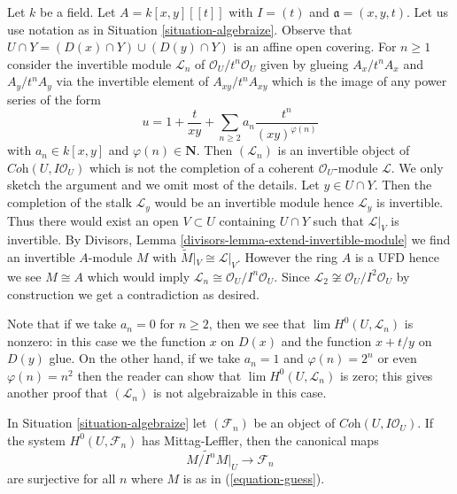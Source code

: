 \begin{example}
\label{example-not-algebraizable}
Let $k$ be a field. Let $A = k[x, y][[t]]$ with $I = (t)$ and
$\mathfrak a = (x, y, t)$. Let us use notation as in
Situation \ref{situation-algebraize}. Observe that
$U \cap Y = (D(x) \cap Y) \cup (D(y) \cap Y)$ is an affine
open covering. For $n \geq 1$ consider the invertible
module $\mathcal{L}_n$ of $\mathcal{O}_U/t^n\mathcal{O}_U$
given by glueing $A_x/t^nA_x$ and $A_y/t^nA_y$ via the invertible
element of $A_{xy}/t^nA_{xy}$ which is the image of any power series
of the form
$$
u = 1 + \frac{t}{xy} + \sum_{n \geq 2} a_n \frac{t^n}{(xy)^{\varphi(n)}}
$$
with $a_n \in k[x, y]$ and $\varphi(n) \in \mathbf{N}$.
Then $(\mathcal{L}_n)$ is an invertible object of
$\textit{Coh}(U, I\mathcal{O}_U)$ which is not the
completion of a coherent $\mathcal{O}_U$-module $\mathcal{L}$.
We only sketch the argument and we omit most of the details.
Let $y \in U \cap Y$. Then the completion of the stalk
$\mathcal{L}_y$ would be an invertible module hence $\mathcal{L}_y$
is invertible. Thus there would exist an open $V \subset U$
containing $U \cap Y$ such that $\mathcal{L}|_V$ is invertible.
By Divisors, Lemma \ref{divisors-lemma-extend-invertible-module}
we find an invertible $A$-module $M$ with
$\widetilde{M}|_V \cong \mathcal{L}|_V$. However the ring $A$
is a UFD hence we see $M \cong A$ which would imply
$\mathcal{L}_n \cong \mathcal{O}_U/I^n\mathcal{O}_U$.
Since $\mathcal{L}_2 \not \cong \mathcal{O}_U/I^2\mathcal{O}_U$
by construction we get a contradiction as desired.

\medskip\noindent
Note that if we take $a_n = 0$ for $n \geq 2$, then we see
that $\lim H^0(U, \mathcal{L}_n)$ is nonzero: in this case
we the function $x$ on $D(x)$ and the function $x + t/y$ on $D(y)$
glue. On the other hand, if we take $a_n = 1$ and $\varphi(n) = 2^n$
or even $\varphi(n) = n^2$ then the reader can show that
$\lim H^0(U, \mathcal{L}_n)$ is zero; this gives another proof
that $(\mathcal{L}_n)$ is not algebraizable in this case.
\end{example}

\begin{lemma}
\label{lemma-when-ML}
In Situation \ref{situation-algebraize} let $(\mathcal{F}_n)$ be an object
of $\textit{Coh}(U, I\mathcal{O}_U)$. If the system
$H^0(U, \mathcal{F}_n)$ has Mittag-Leffler, then the canonical maps
$$
\widetilde{M/I^nM}|_U \to \mathcal{F}_n
$$
are surjective for all $n$ where $M$ is as in (\ref{equation-guess}).
\end{lemma}

